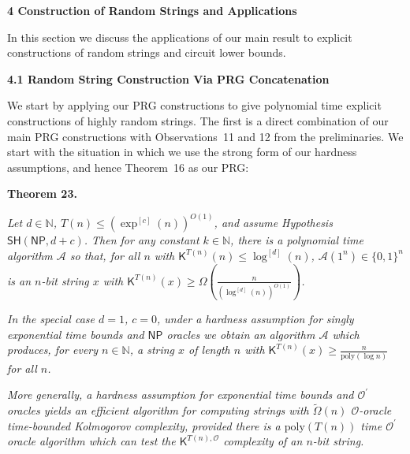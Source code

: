 \documentclass[10pt,a4paper]{article}
\begin{document}
\par\medskip\noindent\textbf{
4 Construction of Random Strings and Applications}\par




In this section we discuss the applications of our main result to explicit constructions of random strings and circuit lower bounds.\par




\par\medskip\noindent\textbf{
4.1 Random String Construction Via PRG Concatenation}\par




We start by applying our PRG constructions to give polynomial time explicit constructions of highly random strings. The first is a direct combination of our main PRG constructions with Observations 11 and 12 from the preliminaries. We start with the situation in which we use the strong form of our hardness assumptions, and hence Theorem 16 as our PRG:\par





\par\medskip\noindent\textbf{
\textbf{Theorem 23}\textbf{.}
}\par



\emph{Let $d\in\mathbb{N}$, $T(n)\leq(\exp^{[c]}(n))^{O(1)}$, and assume Hypothesis $\mathsf{SH}({\mathsf{NP}},d+c)$. Then for any constant $k\in\mathbb{N}$, there is a polynomial time algorithm $\mathcal{A}$ so that, for all $n$ with ${\mathsf{K}}^{T(n)}(n)\leq\log^{[d]}(n)$, $\mathcal{A}(1^{n})\in\{0,1\}^{n}$ is an $n$-bit string $x$ with ${\mathsf{K}}^{T(n)}(x)\geq\Omega(\frac{n}{(\log^{[d]}(n))^{O(1)}})$.}\par




\emph{In the special case $d=1$, $c=0$, under a hardness assumption for singly exponential time bounds and ${\mathsf{NP}}$ oracles we obtain an algorithm $\mathcal{A}$ which produces, for every $n\in\mathbb{N}$, a string $x$ of length $n$ with ${\mathsf{K}}^{T(n)}(x)\geq\frac{n}{\mathrm{poly}(\log n)}$ for all $n$.}\par




\emph{More generally, a hardness assumption for exponential time bounds and $\mathcal{O^{\prime}}$ oracles yields an efficient algorithm for computing strings with $\tilde{\Omega}(n)$ $\mathcal{O}$-oracle time-bounded Kolmogorov complexity, provided there is a $\mathrm{poly}(T(n))$ time $\mathcal{O^{\prime}}$ oracle algorithm which can test the ${\mathsf{K}}^{T(n),\mathcal{O}}$ complexity of an $n$-bit string.}\par
\end{document}
